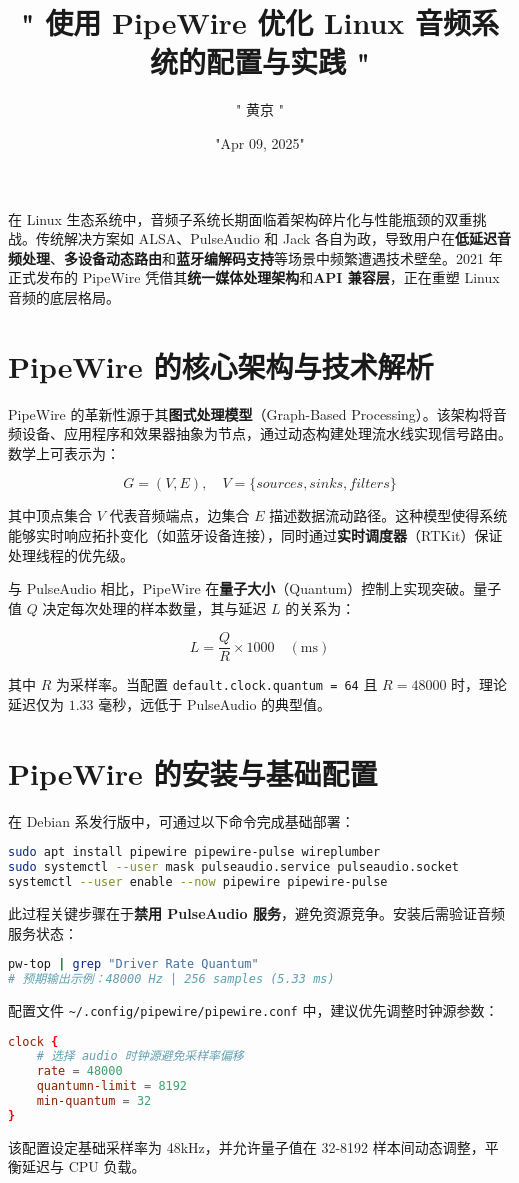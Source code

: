 \title{" 使用 PipeWire 优化 Linux 音频系统的配置与实践 "}
\author{" 黄京 "}
\date{"Apr 09, 2025"}
\maketitle
在 Linux 生态系统中，音频子系统长期面临着架构碎片化与性能瓶颈的双重挑战。传统解决方案如 ALSA、PulseAudio 和 Jack 各自为政，导致用户在\textbf{低延迟音频处理}、\textbf{多设备动态路由}和\textbf{蓝牙编解码支持}等场景中频繁遭遇技术壁垒。2021 年正式发布的 PipeWire 凭借其\textbf{统一媒体处理架构}和\textbf{API 兼容层}，正在重塑 Linux 音频的底层格局。\par
\chapter{PipeWire 的核心架构与技术解析}
PipeWire 的革新性源于其\textbf{图式处理模型}（Graph-Based Processing）。该架构将音频设备、应用程序和效果器抽象为节点，通过动态构建处理流水线实现信号路由。数学上可表示为：\par
$$ G = (V, E),\quad V = \{sources, sinks, filters\} $$\par
其中顶点集合 $V$ 代表音频端点，边集合 $E$ 描述数据流动路径。这种模型使得系统能够实时响应拓扑变化（如蓝牙设备连接），同时通过\textbf{实时调度器}（RTKit）保证处理线程的优先级。\par
与 PulseAudio 相比，PipeWire 在\textbf{量子大小}（Quantum）控制上实现突破。量子值 $Q$ 决定每次处理的样本数量，其与延迟 $L$ 的关系为：\par
$$ L = \frac{Q}{R} \times 1000\quad (\text{ms}) $$\par
其中 $R$ 为采样率。当配置 \verb!default.clock.quantum = 64! 且 $R=48000$ 时，理论延迟仅为 $1.33$ 毫秒，远低于 PulseAudio 的典型值。\par
\chapter{PipeWire 的安装与基础配置}
在 Debian 系发行版中，可通过以下命令完成基础部署：\par
\begin{lstlisting}[language=bash]
sudo apt install pipewire pipewire-pulse wireplumber
sudo systemctl --user mask pulseaudio.service pulseaudio.socket
systemctl --user enable --now pipewire pipewire-pulse
\end{lstlisting}
此过程关键步骤在于\textbf{禁用 PulseAudio 服务}，避免资源竞争。安装后需验证音频服务状态：\par
\begin{lstlisting}[language=bash]
pw-top | grep "Driver Rate Quantum"
# 预期输出示例：48000 Hz | 256 samples (5.33 ms)
\end{lstlisting}
配置文件 \verb!~/.config/pipewire/pipewire.conf! 中，建议优先调整时钟源参数：\par
\begin{lstlisting}[language=conf]
clock {
    # 选择 audio 时钟源避免采样率偏移
    rate = 48000
    quantumn-limit = 8192
    min-quantum = 32
}
\end{lstlisting}
该配置设定基础采样率为 48kHz，并允许量子值在 32-8192 样本间动态调整，平衡延迟与 CPU 负载。\par
